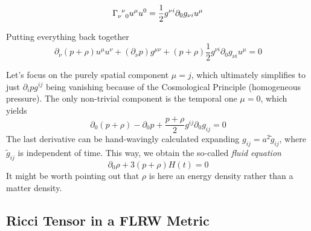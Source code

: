 \begin{equation}
    \Gamma_{\nu\;\;0}^{\;\;\nu}u^{\mu}u^{0} = \frac{1}{2}g^{\nu i}\partial_{0}g_{\nu i}u^{\mu}
\end{equation}
\par Putting everything back together 
\begin{equation}
    \partial_{\nu}(p+\rho)u^{\mu}u^{\nu} + (\partial_{\nu}p) g^{\mu\nu} + (p+\rho)\frac{1}{2}g^{\nu i}\partial_{0}g_{\nu i}u^{\mu} = 0
\end{equation}
\par Let's focus on the purely spatial component $\mu = j$, which ultimately simplifies to just $\partial_{i}p g^{ij}$ being vanishing because of the Cosmological Principle (homogeneous pressure). The only non-trivial component is the temporal one $\mu = 0$, which yields
\begin{equation}
    \partial_{0}(p+\rho)-\partial_{0}p +\frac{p+\rho}{2}g^{ij}\partial_{0}g_{ij} = 0
\end{equation} 
The last derivative can be hand-wavingly calculated expanding $g_{ij} = a^{2}\tilde{g}_{ij}$, where $\tilde{g}_{ij}$ is independent of time. This way, we obtain the so-called \emph{fluid equation}
\begin{equation}
    \boxed{
    \partial_{0}\rho + 3(p+\rho)H(t) = 0
    }
    \label{eq:fluidequation}
\end{equation}
It might be worth pointing out that $\rho$ is here an energy density rather than a matter density.

\subsection{Ricci Tensor in a FLRW Metric}

